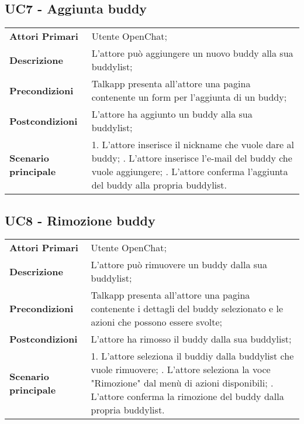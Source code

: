\subsection{UC7 - Aggiunta buddy}
	\begin{center}
	\bgroup
	\def\arraystretch{1.8}     
	\begin{longtable}{  p{4cm} | p{9.5cm} } 
		\textbf{Attori Primari} & Utente OpenChat; \\ 
		\textbf{Descrizione} &  L'attore può aggiungere un nuovo buddy alla sua buddylist; \\ 
		\textbf{Precondizioni}  & Talkapp presenta all'attore una pagina contenente un form per l'aggiunta di un buddy; \\
		\textbf{Postcondizioni} & L'attore ha aggiunto un buddy alla sua buddylist;  \\ 
		\textbf{Scenario principale} & 
		1. L'attore inserisce il nickname che vuole dare al buddy; \newline
		2. L'attore inserisce l'e-mail del buddy che vuole aggiungere; \newline
		3. L'attore conferma l'aggiunta del buddy alla propria buddylist.
	\end{longtable}
	\egroup
\end{center}

\subsection{UC8 - Rimozione buddy}
	\begin{center}
	\bgroup
	\def\arraystretch{1.8}     
	\begin{longtable}{  p{4cm} | p{9.5cm} } 
		\textbf{Attori Primari} & Utente OpenChat; \\ 
		\textbf{Descrizione} &  L'attore può rimuovere un buddy dalla sua buddylist; \\ 
		\textbf{Precondizioni}  & Talkapp presenta all'attore una pagina contenente i dettagli del buddy selezionato e le azioni che possono essere svolte; \\
		\textbf{Postcondizioni} & L'attore ha rimosso il buddy dalla sua buddylist;  \\ 
		\textbf{Scenario principale} & 
		1. L'attore seleziona il buddiy dalla buddylist che vuole rimuovere; \newline
		2. L'attore seleziona la voce "Rimozione" dal menù di azioni disponibili; \newline
		3. L'attore conferma la rimozione del buddy dalla propria buddylist.
	\end{longtable}
	\egroup
\end{center}

